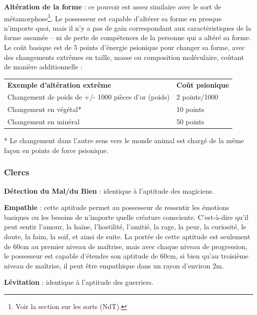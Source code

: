 \documentclass[11pt]{article}
\begin{document}
{\bigskip

\textbf{Altération de la forme} : ce pouvoir est assez similaire avec le sort de métamorphose\footnote{Voir la section sur les sorts (NdT).}. Le possesseur est capable d'altérer sa forme en presque n'importe quoi, mais il n'y a pas de gain correspondant aux caractéristiques de la forme assumée -- ni de perte de compétences de la personne qui a altéré sa forme. Le coût basique est de 5 points d'énergie psionique pour changer sa forme, avec des changements extrêmes en taille, masse ou composition moléculaire, coûtant de manière additionnelle :

\bigskip

\begin{tabular}{p{10cm}l}
\textbf{Exemple d'altération extrême} & \textbf{Coût psionique} \\
Changement de poids de +/- 1000 pièces d'or (poids) & 2 points/1000 \\
Changement en végétal* & 10 points \\
Changement en minéral & 50 points \\
\end{tabular}

\bigskip

* Le changement dans l'autre sens vers le monde animal est chargé de la même façon en points de force psionique.

\subsubsection*{Clercs}

\textbf{Détection du Mal/du Bien} : identique à l'aptitude des magiciens.

\bigskip

\textbf{Empathie} : cette aptitude permet au possesseur de ressentir les émotions basiques ou les besoins de n'importe quelle créature consciente. C'est-à-dire qu'il peut sentir l'amour, la haine, l'hostilité, l'amitié, la rage, la peur, la curiosité, le doute, la faim, la soif, et ainsi de suite. La portée de cette aptitude est seulement de 60cm au premier niveau de maîtrise, mais avec chaque niveau de progression, le possesseur est capable d'étendre son aptitude de 60cm, si bien qu'au troisième niveau de maîtrise, il peut être empathique dans un rayon d'environ 2m.

\bigskip

\textbf{Lévitation} : identique à l'aptitude des guerriers.

\bigskip

}
\end{document}
